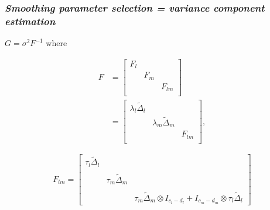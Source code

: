 \documentclass[12pt]{beamer}
\newcommand{\ms}{\scriptscriptstyle}
\begin{document}
\begin{frame}
\frametitle{\emph{\normalsize{Smoothing parameter selection = variance component estimation}}}

\vspace{0.2in}
$G = \sigma^2 F^{-1}$ where

\begin{align*}
F &= \left[\begin{array}{ccc}
F_{\ms l} &&\\
&F_{\ms m} &\\
&& F_{\ms lm}\\
\end{array}\right]\\
 &= \left[\begin{array}{ccc}
\lambda_l \tilde{\Delta}_l &&\\
&\lambda_m \tilde{\Delta}_m &\\
&& F_{\ms lm}\\
\end{array}\right],
\end{align*}
%

\begin{equation*}
 F_{\ms lm} = \left[\begin{array}{ccc}
\tau_l \tilde{\Delta}_l &&\\
&&\\
&\tau_m \tilde{\Delta}_m&\\
&&\\
&&\tau_m \tilde{\Delta}_m \otimes I_{\ms{c_l-d_l}} +  I_{\ms{c_m-d_m}} \otimes \tau_l \tilde{\Delta}_l \end{array}\right]
\end{equation*}


\end{frame}
\end{document}
